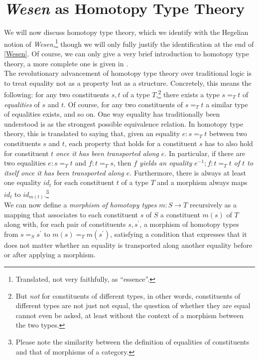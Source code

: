 \documentclass{article}
\begin{document}
\section{\emph{Wesen} as Homotopy Type Theory}\label{Hott}
We will now discuss homotopy type theory, which we identify with the Hegelian notion of \emph{Wesen},\footnote{Translated,
not very faithfully, as ``essence''.} though we will only fully justify the identification at the end of \ref{Wesen}.
Of course, we can only give a very brief introduction to homotopy type theory, a more complete one is
given in \cite{Shuhott}. \\

The revolutionary advancement of homotopy type theory over traditional logic
is to treat equality not as a property but as a structure. Concretely, this means the following: for any
two constituents $s,t$ of a type $T$,\footnote{But \emph{not} for constituents of different types, in other
words, constituents of different types are not just not equal, the question of whether they are equal
cannot even be asked, at least without the context of a morphism between the two types.} there exists
a type $s=_T t$ of \emph{equalities} of $s$ and $t$. Of course, for any two constituents of $s=_T t$ a
similar type of equalities exists, and so on. One way equality has traditionally been understood is as
the strongest possible equivalence relation. In homotopy type theory, this is translated to saying that,
given an equality $e:s=_T t$ between two constituents $s$ and $t$, each property that holds for a constituent
$s$ has to also hold for constituent $t$ \emph{once it has been transported along $e$}. In particular,
if there are two equalities $e:s=_T t$ and $f:t=_T s$, then \emph{$f$ yields an equality $e^{-1};f:t=_T t$ of $t$ to
itself once it has been transported along $e$}. Furthermore, there is always at least one equality $id_t$ for each constituent $t$ of a type $T$ and a morphism always maps $id_t$ to $id_{m(t)}$.\footnote{Please note the similarity between the definition of equalities of constituents and that of morphisms of a category.} \\

We can now define a \emph{morphism of homotopy types} $m:S\rightarrow T$ 
recursively as a mapping that associates to each constituent $s$ of $S$
a constituent $m(s)$ of $T$ along with, for each pair of constituents $s,s^{\prime}$, a morphism of homotopy types from
 $s=_{S} s^{\prime}$ to $m(s)=_T m(s^{\prime})$, satisfying a condition that expresses that it does
not matter whether an equality is transported along another equality before or after applying a morphism. \\
\end{document}
